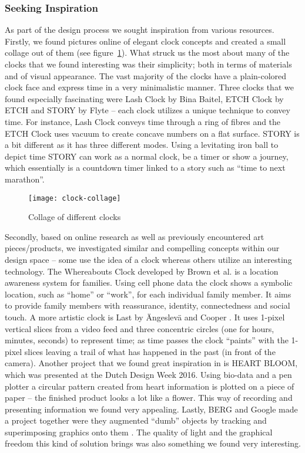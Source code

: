 \subsubsection*{Seeking Inspiration}
As part of the design process we sought inspiration from various resources. Firstly, we found pictures online of elegant clock concepts and created a small collage out of them (see figure~\ref{fig:clock-collage}). What struck us the most about many of the clocks that we found interesting was their simplicity; both in terms of materials and of visual appearance. The vast majority of the clocks have a plain-colored clock face and express time in a very minimalistic manner. Three clocks that we found especially fascinating were Lash Clock by Bina Baitel, ETCH Clock by ETCH and STORY by Flyte \cite{lash-clock,etch-clock,story} -- each clock utilizes a unique technique to convey time. For instance, Lash Clock conveys time through a ring of fibres and the ETCH Clock uses vacuum to create concave numbers on a flat surface. STORY is a bit different as it has three different modes. Using a levitating iron ball to depict time STORY can work as a normal clock, be a timer or show a journey, which essentially is a countdown timer linked to a story such as “time to next marathon”.


\begin{figure}[h]
	\centering
	\texttt{[image: clock-collage]}
	\caption{Collage of different clocks}
	\label{fig:clock-collage}
\end{figure}

Secondly, based on online research as well as previously encountered art pieces/products, we investigated similar and compelling concepts within our design space -- some use the idea of a clock whereas others utilize an interesting technology. The Whereabouts Clock developed by Brown et al. \cite{brown2007locating} is a location awareness system for families. Using cell phone data the clock shows a symbolic location, such as “home” or “work”, for each individual family member. It aims to provide family members with reassurance, identity, connectedness and social touch. A more artistic clock is Last by Ängeslevä and Cooper \cite{angesleva2005last}. It uses 1-pixel vertical slices from a video feed and three concentric circles (one for hours, minutes, seconds) to represent time; as time passes the clock “paints” with the 1-pixel slices leaving a trail of what has happened in the past (in front of the camera). Another project that we found great inspiration in is HEART BLOOM, which was presented at the Dutch Design Week 2016. Using bio-data and a pen plotter a circular pattern created from heart information is plotted on a piece of paper -- the finished product looks a lot like a flower. This way of recording and presenting information we found very appealing. Lastly, BERG and Google made a project together were they augmented “dumb” objects by tracking and superimposing graphics onto them \cite{berg2011lamps}. The quality of light and the graphical freedom this kind of solution brings was also something we found very interesting.


